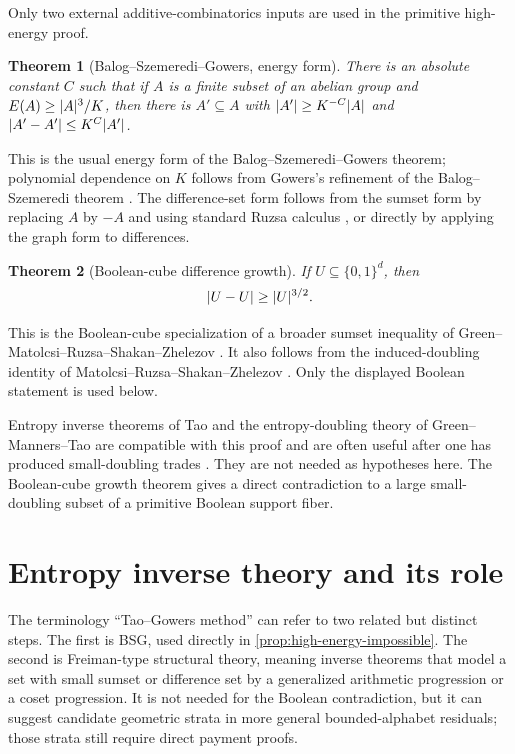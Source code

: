\documentclass[11pt,a4paper]{amsart}
\numberwithin{equation}{section}
\newtheorem{theorem}{Theorem}[section]
\theoremstyle{remark}
\begin{document}
Only two external additive-combinatorics inputs are used in the primitive high-energy proof.

\begin{theorem}[Balog--Szemeredi--Gowers, energy form]\label{thm:bsg}
There is an absolute constant \(C\) such that if \(A\) is a finite subset of an abelian group and \(E(A)\ge \lvert A\rvert^3/K\), then there is \(A'\subseteq A\) with \(\lvert A'\rvert\ge K^{-C}\lvert A\rvert\) and \(\lvert A'-A'\rvert\le K^C\lvert A'\rvert\).
\end{theorem}

This is the usual energy form of the Balog--Szemeredi--Gowers theorem; polynomial dependence on \(K\) follows from Gowers's refinement of the Balog--Szemeredi theorem \cite{BalogSzemeredi,GowersSzemeredi}.  The difference-set form follows from the sumset form by replacing \(A\) by \(-A\) and using standard Ruzsa calculus \cite{TaoVu}, or directly by applying the graph form to differences.

\begin{theorem}[Boolean-cube difference growth]\label{thm:quasicube}
If \(U\subseteq\{0,1\}^d\), then
\[
                  \lvert U-U\rvert\ge \lvert U\rvert^{3/2}.
\]
\end{theorem}

This is the Boolean-cube specialization of a broader sumset inequality
of Green--Matolcsi--Ruzsa--Shakan--Zhelezov
\cite{GreenMatolcsiRuzsaShakanZhelezov}.  It also follows from the
induced-doubling identity of Matolcsi--Ruzsa--Shakan--Zhelezov
\cite{MatolcsiRuzsaShakanZhelezov}.  Only the displayed Boolean statement
is used below.

\begin{remark}
Entropy inverse theorems of Tao and the entropy-doubling theory of Green--Manners--Tao are compatible with this proof and are often useful after one has produced small-doubling trades \cite{TaoEntropy,GreenMannersTao}.  They are not needed as hypotheses here.  The Boolean-cube growth theorem gives a direct contradiction to a large small-doubling subset of a primitive Boolean support fiber.
\end{remark}


\section{Entropy inverse theory and its role}\label{sec:entropy-role}

The terminology ``Tao--Gowers method'' can refer to two related but
distinct steps.  The first is BSG, used directly in
\cref{prop:high-energy-impossible}.  The second is Freiman-type structural
theory, meaning inverse theorems that model a set with small sumset or
difference set by a generalized arithmetic progression or a coset
progression.  It is not needed for the Boolean contradiction, but it can suggest
candidate geometric strata in more general bounded-alphabet residuals;
those strata still require direct payment proofs.
\end{document}
